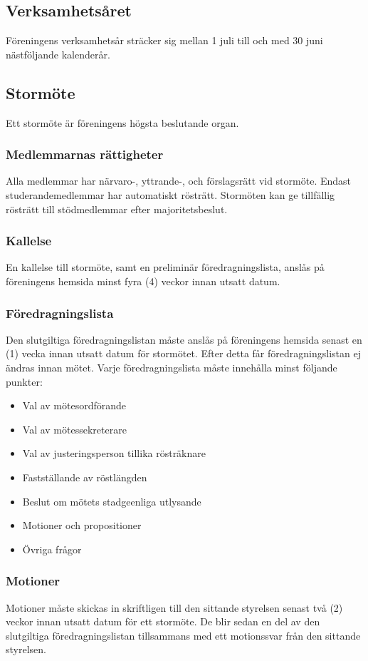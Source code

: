 \documentclass[11pt,a4paper]{article}
\begin{document}
\subsection{Verksamhetsåret}
Föreningens verksamhetsår sträcker sig mellan 1 juli till och med 30 juni nästföljande kalenderår.
\subsection{Stormöte}
Ett stormöte är föreningens högsta beslutande organ.
\subsubsection{Medlemmarnas rättigheter}
Alla medlemmar har närvaro-, yttrande-, och förslagsrätt vid stormöte. Endast studerandemedlemmar har automatiskt rösträtt.
Stormöten kan ge  tillfällig rösträtt till stödmedlemmar efter majoritetsbeslut.
\subsubsection{Kallelse}\label{sec:kallelse}
En kallelse till stormöte, samt en preliminär föredragningslista, anslås på föreningens hemsida minst fyra (4) veckor innan utsatt datum.
\subsubsection{Föredragningslista}\label{sec:dagordning}
Den slutgiltiga föredragningslistan måste anslås på föreningens hemsida senast en (1) vecka innan utsatt datum för stormötet. Efter detta får föredragningslistan ej ändras innan mötet. Varje föredragningslista måste innehålla minst följande punkter:
\begin{itemize}
	\item Val av mötesordförande
	\item Val av mötessekreterare
	\item Val av justeringsperson tillika rösträknare
	\item Fastställande av röstlängden
	\item Beslut om mötets stadgeenliga utlysande
	\item Motioner och propositioner
	\item Övriga frågor
\end{itemize}
\subsubsection{Motioner}
Motioner måste skickas in skriftligen till den sittande styrelsen senast två (2) veckor innan utsatt datum för ett stormöte. De blir sedan en del av den slutgiltiga föredragningslistan tillsammans med ett motionssvar från den sittande styrelsen.
\end{document}
